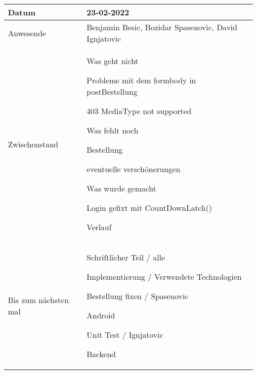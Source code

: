 \begin{center}
    \begin{tabular}{ |p{3cm}|p{10cm}|  }
        \hline
        Datum & 23-02-2022\\
        \hline
        Anwesende & Benjamin Besic, Bozidar Spasenovic, David Ignjatovic\\

        \hline
        Zwischenstand& Was geht nicht

        Probleme mit dem formbody in postBestellung
    
            403 MediaType not supported
    
    Was fehlt noch
    
        Bestellung
    
        eventuelle verschönerungen
    
     Was wurde gemacht
    
        Login gefixt mit CountDownLatch()
    
        Verlauf
    
    \\
        \hline
        Bis zum nächsten mal &  

        Schriftlicher Teil / alle
    
            Implementierung / Verwendete Technologien
    
        Bestellung fixen / Spasenovic
    
            Android
    
        Unit Test / Ignjatovic
    
            Backend
    
    \\
        \hline
    \end{tabular}
\end{center}




